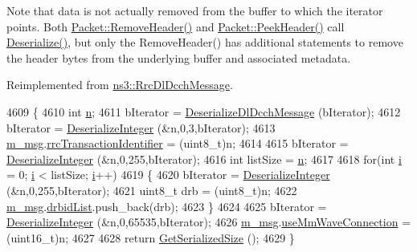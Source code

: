 Note that data is not actually removed from the buffer to which the iterator points. Both \hyperlink{classns3_1_1Packet_a0961eccf975d75f902d40956c93ba63e}{Packet\+::\+Remove\+Header()} and \hyperlink{classns3_1_1Packet_aadc63487bea70945c418f4c3e9b81964}{Packet\+::\+Peek\+Header()} call \hyperlink{classns3_1_1RrcConnectionSwitchHeader_a9b27f43e1e87cbeb554ceb0ef818210e}{Deserialize()}, but only the Remove\+Header() has additional statements to remove the header bytes from the underlying buffer and associated metadata. 

Reimplemented from \hyperlink{classns3_1_1RrcDlDcchMessage_a656baac96990031053ce3fb4f1ec596a}{ns3\+::\+Rrc\+Dl\+Dcch\+Message}.


\begin{DoxyCode}
4609 \{
4610   \textcolor{keywordtype}{int} \hyperlink{namespacesample-rng-plot_aeb5ee5c431e338ef39b7ac5431242e1d}{n};
4611   bIterator = \hyperlink{classns3_1_1RrcDlDcchMessage_afa8618901d8be7727b6a579a246055b2}{DeserializeDlDcchMessage} (bIterator);
4612   bIterator = \hyperlink{classns3_1_1Asn1Header_a49802c9af30018b078150e866b6ecae2}{DeserializeInteger} (&n,0,3,bIterator);
4613   \hyperlink{classns3_1_1RrcConnectionSwitchHeader_ab9030529ce76bdb2822b068a7f2276f7}{m\_msg}.\hyperlink{structns3_1_1LteRrcSap_1_1RrcConnectionSwitch_a021a528acde54bc37e6e4580581e7b63}{rrcTransactionIdentifier} = (uint8\_t)n;
4614 
4615   bIterator = \hyperlink{classns3_1_1Asn1Header_a49802c9af30018b078150e866b6ecae2}{DeserializeInteger} (&n,0,255,bIterator);
4616   \textcolor{keywordtype}{int} listSize = \hyperlink{namespacesample-rng-plot_aeb5ee5c431e338ef39b7ac5431242e1d}{n};
4617 
4618   \textcolor{keywordflow}{for}(\textcolor{keywordtype}{int} \hyperlink{bernuolliDistribution_8m_a6f6ccfcf58b31cb6412107d9d5281426}{i} = 0; \hyperlink{bernuolliDistribution_8m_a6f6ccfcf58b31cb6412107d9d5281426}{i} < listSize; \hyperlink{bernuolliDistribution_8m_a6f6ccfcf58b31cb6412107d9d5281426}{i}++)
4619   \{
4620     bIterator = \hyperlink{classns3_1_1Asn1Header_a49802c9af30018b078150e866b6ecae2}{DeserializeInteger} (&n,0,255,bIterator);
4621     uint8\_t drb = (uint8\_t)n;
4622     \hyperlink{classns3_1_1RrcConnectionSwitchHeader_ab9030529ce76bdb2822b068a7f2276f7}{m\_msg}.\hyperlink{structns3_1_1LteRrcSap_1_1RrcConnectionSwitch_a7a984276a6f8a5c9ec93daeeb7cf005c}{drbidList}.push\_back(drb);
4623   \}
4624 
4625   bIterator = \hyperlink{classns3_1_1Asn1Header_a49802c9af30018b078150e866b6ecae2}{DeserializeInteger} (&n,0,65535,bIterator);
4626   \hyperlink{classns3_1_1RrcConnectionSwitchHeader_ab9030529ce76bdb2822b068a7f2276f7}{m\_msg}.\hyperlink{structns3_1_1LteRrcSap_1_1RrcConnectionSwitch_a9b44955f7fbd9febc3d1c1a57abbc1b3}{useMmWaveConnection} = (uint16\_t)n;
4627 
4628   \textcolor{keywordflow}{return} \hyperlink{classns3_1_1Asn1Header_a18a67eb7869c5784f59d197bbd76a74f}{GetSerializedSize} ();
4629 \}
\end{DoxyCode}


